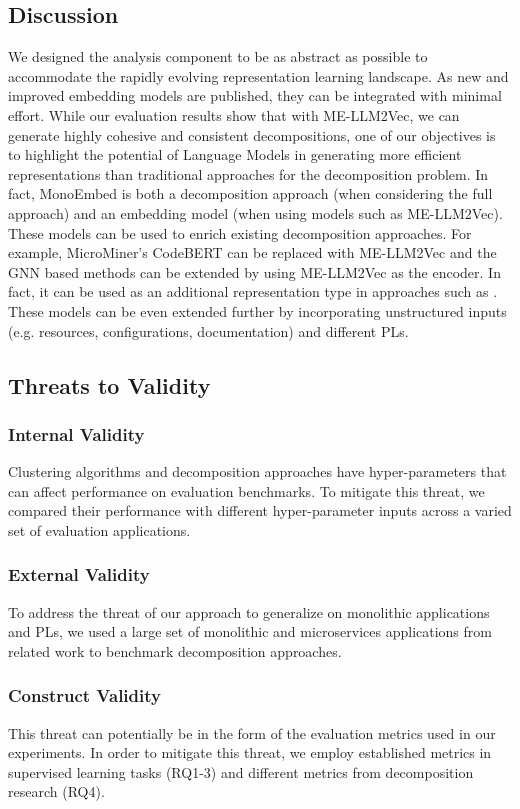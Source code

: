 \subsection{Discussion}


We designed the analysis component to be as abstract as possible to accommodate the rapidly evolving representation learning landscape. As new and improved embedding models are published, they can be integrated with minimal effort. While our evaluation results show that with ME-LLM2Vec, we can generate highly cohesive and consistent decompositions, one of our objectives is to highlight the potential of Language Models in generating more efficient representations than traditional approaches for the decomposition problem. In fact, MonoEmbed is both a decomposition approach (when considering the full approach) and an embedding model (when using models such as ME-LLM2Vec). These models can be used to enrich existing decomposition approaches. For example, MicroMiner's CodeBERT \cite{trabelsi2023microminer} can be replaced with ME-LLM2Vec and the GNN based methods \cite{desai2021cogcn,yedida2023deeply,mathai2022chgnn,qian2023gdcdvf} can be extended by using ME-LLM2Vec as the encoder. In fact, it can be used as an additional representation type in approaches such as \cite{khaled2022hydecomp,qian2023gdcdvf}. These models can be even extended further by incorporating unstructured inputs (e.g. resources, configurations, documentation) and different PLs.




\subsection{Threats to Validity}
\subsubsection{Internal Validity}
Clustering algorithms and decomposition approaches have hyper-parameters that can affect performance on evaluation benchmarks. To mitigate this threat, we compared their performance with different hyper-parameter inputs across a varied set of evaluation applications.

\subsubsection{External Validity}
To address the threat of our approach to generalize on monolithic applications and PLs, we used a large set of monolithic and microservices applications from related work \cite{kalia2021mono2micro,khaled2022hydecomp,yedida2023deeply,jin2021fosci} to benchmark decomposition approaches. 

\subsubsection{Construct Validity}
This threat can potentially be in the form of the evaluation metrics used in our experiments. In order to mitigate this threat, we employ established metrics in supervised learning tasks (RQ1-3) and different metrics from decomposition research \cite{khaled2022hydecomp,kalia2021mono2micro,jin2021fosci,yedida2023deeply,mathai2022chgnn} (RQ4). 